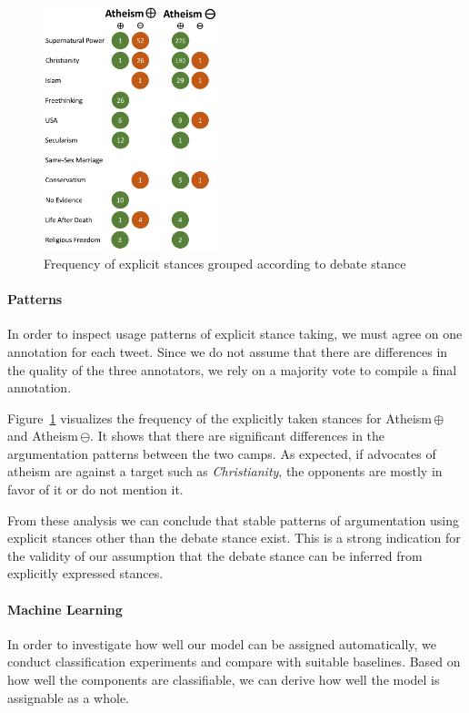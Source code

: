 \documentclass[11pt]{article}
\begin{document}
\begin{figure}
\centering
  \includegraphics[width=0.45\textwidth]{figures/patterns_flat.png}
  \caption{Frequency of explicit stances grouped according to debate stance}
  \label{fig:patterns_flat}
\end{figure}

\paragraph{Patterns}
In order to inspect usage patterns of explicit stance taking, we must agree on one annotation for each tweet.
Since we do not assume that there are differences in the quality of the three annotators, we rely on a majority vote to compile a final annotation. 

Figure~\ref{fig:patterns_flat} visualizes the frequency of the explicitly taken stances for Atheism\,$\oplus$ and Atheism\,$\ominus$.
It shows that there are significant differences in the argumentation patterns between the two camps.
As expected, if advocates of atheism are against a target such as \textit{Christianity}, the opponents are mostly in favor of it or do not mention it.

From these analysis we can conclude that stable patterns of argumentation using explicit stances other than the debate stance exist.
This is a strong indication for the validity of our assumption that the debate stance can be inferred from explicitly expressed stances.

\paragraph{Machine Learning}

In order to investigate how well our model can be assigned automatically, we conduct classification experiments and compare with suitable baselines.
Based on how well the components are classifiable, we can derive how well the model is assignable as a whole.
\end{document}
